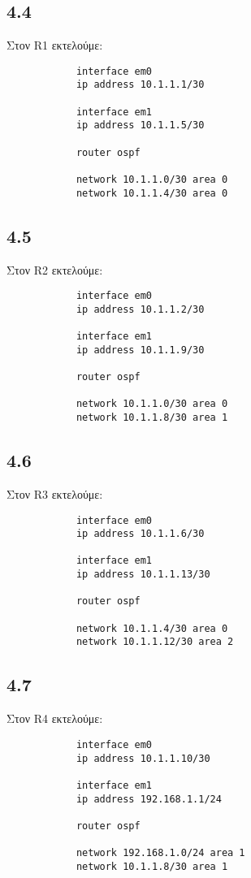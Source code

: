 \documentclass[a4paper, 12pt]{article}
\begin{document}
	\subsection*{4.4}
		Στον R1 εκτελούμε:
		
		\begin{verbatim}
			interface em0
			ip address 10.1.1.1/30
			
			interface em1
			ip address 10.1.1.5/30
			
			router ospf
			
			network 10.1.1.0/30 area 0
			network 10.1.1.4/30 area 0
		\end{verbatim}
	
	\subsection*{4.5}
		Στον R2 εκτελούμε:
		
		\begin{verbatim}
			interface em0
			ip address 10.1.1.2/30
			
			interface em1
			ip address 10.1.1.9/30
			
			router ospf
			
			network 10.1.1.0/30 area 0
			network 10.1.1.8/30 area 1
		\end{verbatim}
	
	\subsection*{4.6}
		Στον R3 εκτελούμε:
		
		\begin{verbatim}
			interface em0
			ip address 10.1.1.6/30
			
			interface em1
			ip address 10.1.1.13/30
			
			router ospf
			
			network 10.1.1.4/30 area 0
			network 10.1.1.12/30 area 2
		\end{verbatim}

	\subsection*{4.7}
		Στον R4 εκτελούμε:
		
		\begin{verbatim}
			interface em0
			ip address 10.1.1.10/30
			
			interface em1
			ip address 192.168.1.1/24
			
			router ospf
			
			network 192.168.1.0/24 area 1
			network 10.1.1.8/30 area 1
		\end{verbatim}
\end{document}
